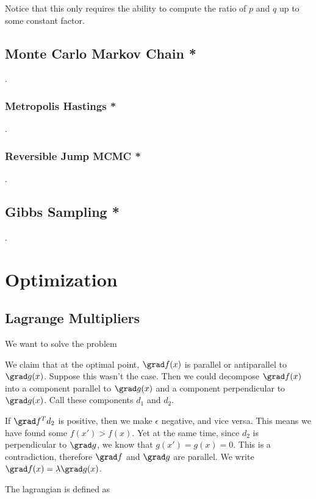 \documentclass[12pt]{article}
\begin{document}
Notice that this only requires the ability to compute the ratio of $p$ and $q$ up to some constant factor.
\fi

\subsection{Monte Carlo Markov Chain *}
.
\subsubsection{Metropolis Hastings *}
.
\subsubsection{Reversible Jump MCMC *}
.
\subsection{Gibbs Sampling *}
.
\section{Optimization}

\subsection{Lagrange Multipliers}

We want to solve the problem


We claim that at the optimal point, $\grad f(x)$ is parallel or antiparallel to $\grad g(x)$. Suppose this wasn't the case. Then we could decompose $\grad f(x)$ into a component parallel to $\grad g(x)$ and a component perpendicular to $\grad g(x)$. Call these components $d_1$ and $d_2$. 


If $\grad f ^T d_2$ is positive, then we make $\epsilon$ negative, and vice versa. This means we have found some $f(x') > f(x)$. Yet at the same time, since $d_2$ is perpendicular to $\grad g$, we know that $g(x') = g(x) = 0$. This is a contradiction, therefore $\grad f$ and $\grad g$ are parallel. We write $\grad f(x) = \lambda \grad g(x)$.

The lagrangian is defined as

\end{document}
